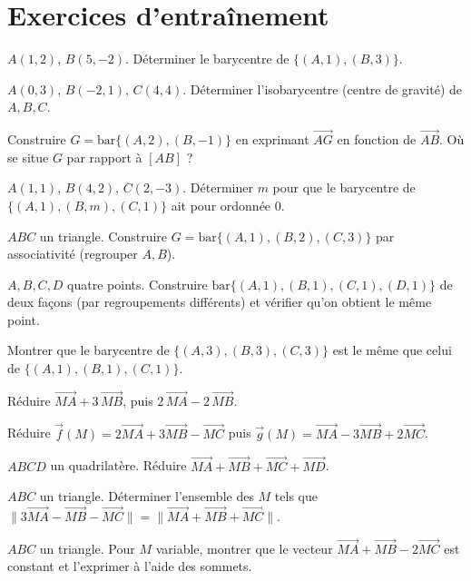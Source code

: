 \section{Exercices d'entraînement}

\exo{} $A(1,2)$, $B(5,-2)$. Déterminer le barycentre de $\{(A,1),(B,3)\}$.

\exo{} $A(0,3)$, $B(-2,1)$, $C(4,4)$. Déterminer l'isobarycentre (centre de gravité) de $A,B,C$.

\exo{} Construire $G=\mathrm{bar}\{(A,2),(B,-1)\}$ en exprimant $\overrightarrow{AG}$ en fonction de $\overrightarrow{AB}$. Où se situe $G$ par rapport à $[AB]$ ?

\exo{} $A(1,1)$, $B(4,2)$, $C(2,-3)$. Déterminer $m$ pour que le barycentre de $\{(A,1),(B,m),(C,1)\}$ ait pour ordonnée $0$.

\exo{} $ABC$ un triangle. Construire $G=\mathrm{bar}\{(A,1),(B,2),(C,3)\}$ par associativité (regrouper $A,B$).

\exo{} $A,B,C,D$ quatre points. Construire $\mathrm{bar}\{(A,1),(B,1),(C,1),(D,1)\}$ de deux façons (par regroupements différents) et vérifier qu'on obtient le même point.

\exo{} Montrer que le barycentre de $\{(A,3),(B,3),(C,3)\}$ est le même que celui de $\{(A,1),(B,1),(C,1)\}$.

\exo{} Réduire $\overrightarrow{MA}+3\,\overrightarrow{MB}$, puis $2\,\overrightarrow{MA}-2\,\overrightarrow{MB}$.

\exo{} Réduire $\vec f(M)=2\overrightarrow{MA}+3\overrightarrow{MB}-\overrightarrow{MC}$ puis $\vec g(M)=\overrightarrow{MA}-3\overrightarrow{MB}+2\overrightarrow{MC}$.

\exo{} $ABCD$ un quadrilatère. Réduire $\overrightarrow{MA}+\overrightarrow{MB}+\overrightarrow{MC}+\overrightarrow{MD}$.

\exo{} $ABC$ un triangle. Déterminer l'ensemble des $M$ tels que $\big\|3\overrightarrow{MA}-\overrightarrow{MB}-\overrightarrow{MC}\big\|=\big\|\overrightarrow{MA}+\overrightarrow{MB}+\overrightarrow{MC}\big\|$.

\exo{} $ABC$ un triangle. Pour $M$ variable, montrer que le vecteur $\overrightarrow{MA}+\overrightarrow{MB}-2\overrightarrow{MC}$ est constant et l'exprimer à l'aide des sommets.


